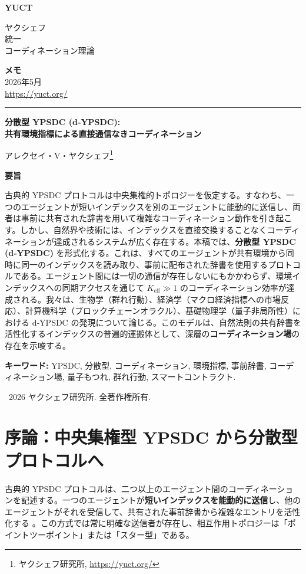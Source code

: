 \documentclass[11pt,a4paper]{article}
\newcommand{\makeheader}{%
	\noindent
	\begin{minipage}{0.17\textwidth}
		\raggedright
		{\sffamily\bfseries\color{skyblue}\fontsize{46}{46}\selectfont YUCT}%
	\end{minipage}%
	\hspace{30pt}
	\begin{minipage}{0.32\textwidth}
		\raggedright
		{\sffamily\fontsize{11}{13}\selectfont ヤクシェフ\\ 統一\\ コーディネーション理論}%
	\end{minipage}%
	\hfill
	\begin{minipage}{0.38\textwidth}
		\raggedleft
		{\sffamily\bfseries メモ}\\
		{\sffamily 2026年5月}\\
		{\sffamily\footnotesize \url{https://yuct.org/}}%
	\end{minipage}
	\par\vspace{5pt}
	\noindent\textcolor{gold}{\rule{\textwidth}{1.6pt}}
	\par\vspace{0pt}
}
\begin{document}
	\renewcommand{\thepage}{\arabic{page}}
	\thispagestyle{firstpage}
	\makeheader
	
	\vspace{0cm}
	{\LARGE\bfseries 分散型 YPSDC (d‑YPSDC): \\ 共有環境指標による直接通信なきコーディネーション \par}
	\vspace{0.2cm}
	
	{\large アレクセイ・V・ヤクシェフ\footnote{ヤクシェフ研究所, \url{https://yuct.org/}}} \\
	\vspace{0.0cm}
	
	{\color{darkblue}\textbf{\LARGE 要旨}} \par
	{\large
		\noindent
		古典的 YPSDC プロトコルは中央集権的トポロジーを仮定する。すなわち、一つのエージェントが短いインデックスを別のエージェントに能動的に送信し、両者は事前に共有された辞書を用いて複雑なコーディネーション動作を引き起こす。しかし、自然界や技術には、インデックスを直接交換することなくコーディネーションが達成されるシステムが広く存在する。本稿では、\textbf{分散型 YPSDC (d‑YPSDC)} を形式化する。これは、すべてのエージェントが共有環境から同時に同一のインデックスを読み取り、事前に配布された辞書を使用するプロトコルである。エージェント間には一切の通信が存在しないにもかかわらず、環境インデックスへの同期アクセスを通じて \(K_{\mathrm{eff}} \gg 1\) のコーディネーション効率が達成される。我々は、生物学（群れ行動）、経済学（マクロ経済指標への市場反応）、計算機科学（ブロックチェーンオラクル）、基礎物理学（量子非局所性）における d‑YPSDC の発現について論じる。このモデルは、自然法則の共有辞書を活性化するインデックスの普遍的運搬体として、深層の\textbf{コーディネーション場}の存在を示唆する。
	}
	
	\vspace{0.1cm}
	\noindent
	{\color{darkblue}\textbf{キーワード:}} YPSDC, 分散型, コーディネーション, 環境指標, 事前辞書, コーディネーション場, 量子もつれ, 群れ行動, スマートコントラクト.
	
	\vspace{0.5cm}
	\noindent
	\textcopyright\ 2026 ヤクシェフ研究所. 全著作権所有.
	
	\tableofcontents
	\newpage
	
	\section{序論：中央集権型 YPSDC から分散型プロトコルへ}
	
	古典的 YPSDC プロトコルは、二つ以上のエージェント間のコーディネーションを記述する。一つのエージェントが\textbf{短いインデックスを能動的に送信}し、他のエージェントがそれを受信して、共有された事前辞書から複雑なエントリを活性化する \cite{YUCT}。この方式では常に明確な送信者が存在し、相互作用トポロジーは「ポイントツーポイント」または「スター型」である。
	
\end{document}
